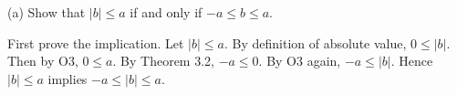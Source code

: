 
(a) Show that $|b|\le a$ if and only if $-a\le b\le a$.

\medskip
First prove the implication.
Let $|b|\le a$.
By definition of absolute value, $0\le|b|$.
Then by O3, $0\le a$.
By Theorem 3.2, $-a\le0$.
By O3 again, $-a\le|b|$.
Hence $|b|\le a$ implies $-a\le|b|\le a$.

